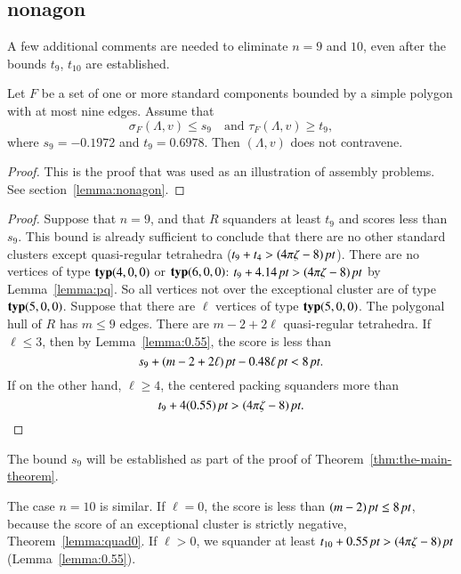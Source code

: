 \subsection{nonagon} %
    \label{sec:nonagon}

A few additional comments are needed to eliminate $n=9$ and $10$,
even after the bounds $t_9$, $t_{10}$ are established.

\begin{lemma} \label{lemma:s9-t9}
Let $F$ be a set of one or more standard components bounded by a simple
polygon with at most nine edges.  Assume  that
    $$\sigma_F(\Lambda,v) \le s_9\quad\text{and }\tau_F(\Lambda,v)\ge t_9,$$
where $s_9=-0.1972$ and $t_9=0.6978$.  Then $(\Lambda,v)$ does not
contravene.
\end{lemma}

\begin{proof} This is the proof that was used as an illustration
of  assembly problems.  See section~\ref{lemma:nonagon}.
\end{proof}

\begin{proof}
Suppose that $n=9$, and that $R$ squanders at least $t_9$ and
scores less than $s_9$.  This bound is already sufficient to
conclude that there are no other standard clusters except
quasi-regular tetrahedra ($t_9+t_4>(4\pi\zeta-8)\,\hbox{\it pt}$). There are no
vertices of type ${\operatorname{\bf typ}}{(4,0,0)}$ or ${\operatorname{\bf typ}}{(6,0,0)}$: $t_9+4.14\,\hbox{\it pt}>(4\pi\zeta-8)\,\hbox{\it pt}$ by
Lemma~\ref{lemma:pq}.   So all vertices not over the exceptional
cluster are of type ${\operatorname{\bf typ}}{(5,0,0)}$. Suppose that there are $\ell$
vertices of type ${\operatorname{\bf typ}}{(5,0,0)}$. The polygonal hull of $R$ has $m\le 9$
edges. There are $m-2+2\ell$ quasi-regular tetrahedra. If $\ell\le
3$, then by Lemma~\ref{lemma:0.55}, the score is less than
    $$s_9+ (m-2+2\ell)\,\hbox{\it pt} -0.48 \ell\,\hbox{\it pt} < 8\,\hbox{\it pt}.$$
If on the other hand, $\ell\ge 4$, the centered packing squanders
more than
    $$t_9+ 4(0.55)\,\hbox{\it pt} > (4\pi\zeta-8)\,\hbox{\it pt}.$$
\end{proof}


The bound $s_9$ will be established as part of the proof of
Theorem~\ref{thm:the-main-theorem}.

The case $n=10$ is similar.  If $\ell=0$, the score is less than
    $(m-2)\,\hbox{\it pt}\le 8\,\hbox{\it pt}$,
because the score of an exceptional cluster is strictly negative,
Theorem~\ref{lemma:quad0}.  If $\ell>0$, we squander at least
    $t_{10}+ 0.55\,\hbox{\it pt} > (4\pi\zeta-8)\,\hbox{\it pt}$ (Lemma~\ref{lemma:0.55}).



